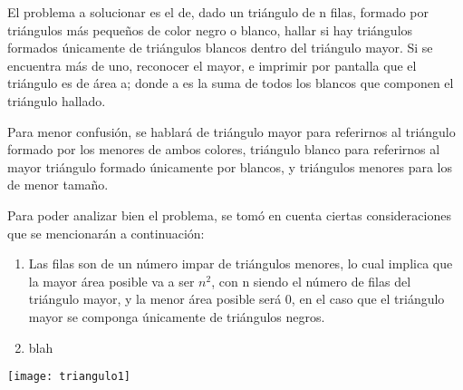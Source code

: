 \documentclass[spanish]{article}
\begin{document}
  \par
  El problema a solucionar es el de, dado un triángulo de n filas,
  formado por triángulos más pequeños de color negro o blanco, hallar si hay
  triángulos formados únicamente de triángulos blancos dentro del triángulo
  mayor. Si se encuentra más de uno, reconocer el mayor, e imprimir por pantalla
  que el triángulo es de área a; donde a es la suma de todos los blancos que
  componen el triángulo hallado.\par
  Para menor confusión, se hablará de triángulo mayor para
  referirnos al triángulo formado por los menores de ambos colores, triángulo
  blanco para referirnos al mayor triángulo formado únicamente por blancos, y
  triángulos menores para los de menor tamaño.\par
  Para poder analizar bien el problema, se tomó en cuenta ciertas
  consideraciones que se mencionarán a continuación:
    \begin{enumerate}
    \item Las filas son de un número impar de triángulos menores,
    lo cual implica que la mayor área posible va a ser \(n^2\), con n siendo el
    número de filas del triángulo mayor, y la menor área posible será 0,
    en el caso que el triángulo mayor se componga únicamente de triángulos
    negros.
    \item blah
    \end{enumerate}

  \begin{center}
  \texttt{[image: triangulo1]}
  \end{center}
\end{document}
